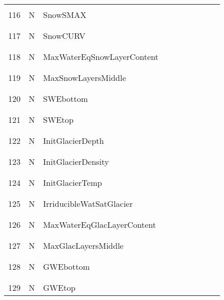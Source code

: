 \begin{longtable}{|c|c|l|c|c|c|c|p{}|c|p{}|}
&&&&&&&&&\\
116 & N & SnowSMAX & & & & & & & \\
&&&&&&&&&\\\hline%
&&&&&&&&&\\
117 & N & SnowCURV & & & & & & & \\
&&&&&&&&&\\\hline%
&&&&&&&&&\\
118 & N & MaxWaterEqSnowLayerContent & & & & & & & \\
&&&&&&&&&\\\hline%
&&&&&&&&&\\
119 & N & MaxSnowLayersMiddle & & & & & & & \\
&&&&&&&&&\\\hline%
&&&&&&&&&\\
120 & N & SWEbottom & & & & & & & \\
&&&&&&&&&\\\hline%
&&&&&&&&&\\
121 & N & SWEtop & & & & & & & \\
&&&&&&&&&\\\hline%
&&&&&&&&&\\
122 & N & InitGlacierDepth & & & & & & & \\
&&&&&&&&&\\\hline%
&&&&&&&&&\\
123 & N & InitGlacierDensity & & & & & & & \\
&&&&&&&&&\\\hline%
&&&&&&&&&\\
124 & N & InitGlacierTemp & & & & & & & \\
&&&&&&&&&\\\hline%
&&&&&&&&&\\
125 & N & IrriducibleWatSatGlacier & & & & & & & \\
&&&&&&&&&\\\hline%
&&&&&&&&&\\
126 & N & MaxWaterEqGlacLayerContent & & & & & & & \\
&&&&&&&&&\\\hline%
&&&&&&&&&\\
127 & N & MaxGlacLayersMiddle & & & & & & & \\
&&&&&&&&&\\\hline%
&&&&&&&&&\\
128 & N & GWEbottom & & & & & & & \\
&&&&&&&&&\\\hline%
&&&&&&&&&\\
129 & N & GWEtop & & & & & & & \\

\end{longtable}

